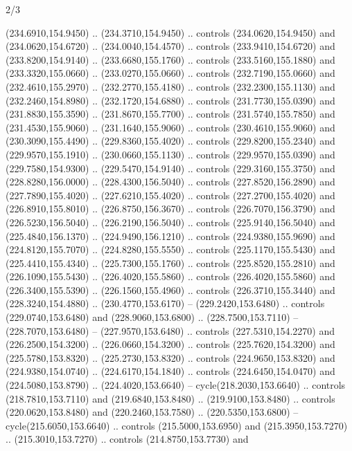 \begin{flagdescription}{2/3}
\begin{scope}[xshift=0.5\flaglength,yshift=0.5\flagwidth,scale=\flagwidth/259.2]
\begin{scope}[y=0.8pt, x=0.8pt, yscale=-1,shift={(-243,-162)}]
      (234.6910,154.9450) .. (234.3710,154.9450) .. controls (234.0620,154.9450) and
      (234.0620,154.6720) .. (234.0040,154.4570) .. controls (233.9410,154.6720) and
      (233.8200,154.9140) .. (233.6680,155.1760) .. controls (233.5160,155.1880) and
      (233.3320,155.0660) .. (233.0270,155.0660) .. controls (232.7190,155.0660) and
      (232.4610,155.2970) .. (232.2770,155.4180) .. controls (232.2300,155.1130) and
      (232.2460,154.8980) .. (232.1720,154.6880) .. controls (231.7730,155.0390) and
      (231.8830,155.3590) .. (231.8670,155.7700) .. controls (231.5740,155.7850) and
      (231.4530,155.9060) .. (231.1640,155.9060) .. controls (230.4610,155.9060) and
      (230.3090,155.4490) .. (229.8360,155.4020) .. controls (229.8200,155.2340) and
      (229.9570,155.1910) .. (230.0660,155.1130) .. controls (229.9570,155.0390) and
      (229.7580,154.9300) .. (229.5470,154.9140) .. controls (229.3160,155.3750) and
      (228.8280,156.0000) .. (228.4300,156.5040) .. controls (227.8520,156.2890) and
      (227.7890,155.4020) .. (227.6210,155.4020) .. controls (227.2700,155.4020) and
      (226.8910,155.8010) .. (226.8750,156.3670) .. controls (226.7070,156.3790) and
      (226.5230,156.5040) .. (226.2190,156.5040) .. controls (225.9140,156.5040) and
      (225.4840,156.1370) .. (224.9490,156.1210) .. controls (224.9380,155.9690) and
      (224.8120,155.7070) .. (224.8280,155.5550) .. controls (225.1170,155.5430) and
      (225.4410,155.4340) .. (225.7300,155.1760) .. controls (225.8520,155.2810) and
      (226.1090,155.5430) .. (226.4020,155.5860) .. controls (226.4020,155.5860) and
      (226.3400,155.5390) .. (226.1560,155.4960) .. controls (226.3710,155.3440) and
      (228.3240,154.4880) .. (230.4770,153.6170) -- (229.2420,153.6480) .. controls
      (229.0740,153.6480) and (228.9060,153.6800) .. (228.7500,153.7110) --
      (228.7070,153.6480) -- (227.9570,153.6480) .. controls (227.5310,154.2270) and
      (226.2500,154.3200) .. (226.0660,154.3200) .. controls (225.7620,154.3200) and
      (225.5780,153.8320) .. (225.2730,153.8320) .. controls (224.9650,153.8320) and
      (224.9380,154.0740) .. (224.6170,154.1840) .. controls (224.6450,154.0470) and
      (224.5080,153.8790) .. (224.4020,153.6640) -- cycle(218.2030,153.6640) ..
      controls (218.7810,153.7110) and (219.6840,153.8480) .. (219.9100,153.8480) ..
      controls (220.0620,153.8480) and (220.2460,153.7580) .. (220.5350,153.6800) --
      cycle(215.6050,153.6640) .. controls (215.5000,153.6950) and
      (215.3950,153.7270) .. (215.3010,153.7270) .. controls (214.8750,153.7730) and

\end{scope}
\end{scope}
\end{flagdescription}
